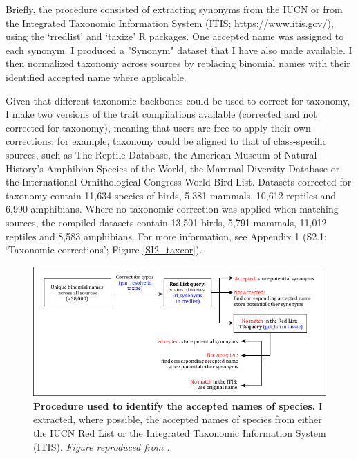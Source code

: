 Briefly, the procedure consisted of extracting synonyms from the IUCN \citep{IUCN2020} or from the Integrated Taxonomic Information System (ITIS; \url{https://www.itis.gov/}), using the `rredlist' \citep{rredlist} and `taxize' \citep{Chamberlain2013} R packages. One accepted name was assigned to each synonym. I produced a "Synonym" dataset that I have also made available. I then normalized taxonomy across sources by replacing binomial names with their identified accepted name where applicable.

Given that different taxonomic backbones could be used to correct for taxonomy, I make two versions of the trait compilations available (corrected and not corrected for taxonomy), meaning that users are free to apply their own corrections; for example, taxonomy could be aligned to that of class-specific sources, such as The Reptile Database, the American Museum of Natural History’s Amphibian Species of the World, the Mammal Diversity Database or the International Ornithological Congress World Bird List. Datasets corrected for taxonomy contain 11,634 species of birds, 5,381 mammals, 10,612 reptiles and 6,990 amphibians. Where no taxonomic correction was applied when matching sources, the compiled datasets contain 13,501 birds, 5,791 mammals, 11,012 reptiles and 8,583 amphibians. For more information, see Appendix 1 (S2.1: `Taxonomic corrections'; Figure \ref{SI2_taxcor}).

\vskip 1cm
\begin{figure}[h!]
\centering
\includegraphics[scale=1.4]{figures/Chapter2/Taxonomic_corrections_chart}
\caption[Procedure used to identify the accepted names of species]{\textbf{Procedure used to identify the accepted names of species.} I extracted, where possible, the accepted names of species from either the IUCN Red List or the Integrated Taxonomic Information System (ITIS). \textit{Figure reproduced from \citet{Etard2020}.}}
\label{chart_taxcor}
\end{figure}


